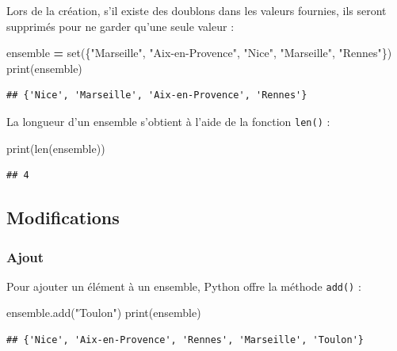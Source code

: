 \documentclass[12pt,]{book}
\newenvironment{Shaded}{\begin{snugshade}}{\end{snugshade}}
\newcommand{\StringTok}[1]{\textcolor[rgb]{0.31,0.60,0.02}{#1}}
\newcommand{\OperatorTok}[1]{\textcolor[rgb]{0.81,0.36,0.00}{\textbf{#1}}}
\newcommand{\BuiltInTok}[1]{#1}
\newcommand{\NormalTok}[1]{#1}
\numberwithin{equation}{section}
\numberwithin{countremarque}{section}
\begin{document}
Lors de la création, s'il existe des doublons dans les valeurs fournies,
ils seront supprimés pour ne garder qu'une seule valeur :

\begin{Shaded}
\begin{Highlighting}[]
\NormalTok{ensemble }\OperatorTok{=} \BuiltInTok{set}\NormalTok{(\{}\StringTok{"Marseille"}\NormalTok{, }\StringTok{"Aix-en-Provence"}\NormalTok{, }\StringTok{"Nice"}\NormalTok{, }\StringTok{"Marseille"}\NormalTok{, }\StringTok{"Rennes"}\NormalTok{\})}
\BuiltInTok{print}\NormalTok{(ensemble)}
\end{Highlighting}
\end{Shaded}

\begin{lstlisting}
## {'Nice', 'Marseille', 'Aix-en-Provence', 'Rennes'}
\end{lstlisting}

La longueur d'un ensemble s'obtient à l'aide de la fonction
\texttt{len()} :

\begin{Shaded}
\begin{Highlighting}[]
\BuiltInTok{print}\NormalTok{(}\BuiltInTok{len}\NormalTok{(ensemble))}
\end{Highlighting}
\end{Shaded}

\begin{lstlisting}
## 4
\end{lstlisting}

\subsection{Modifications}\label{modifications}

\subsubsection{Ajout}\label{ajout}

Pour ajouter un élément à un ensemble, Python offre la méthode
\texttt{add()} :

\begin{Shaded}
\begin{Highlighting}[]
\NormalTok{ensemble.add(}\StringTok{"Toulon"}\NormalTok{)}
\BuiltInTok{print}\NormalTok{(ensemble)}
\end{Highlighting}
\end{Shaded}

\begin{lstlisting}
## {'Nice', 'Aix-en-Provence', 'Rennes', 'Marseille', 'Toulon'}
\end{lstlisting}
\end{document}
